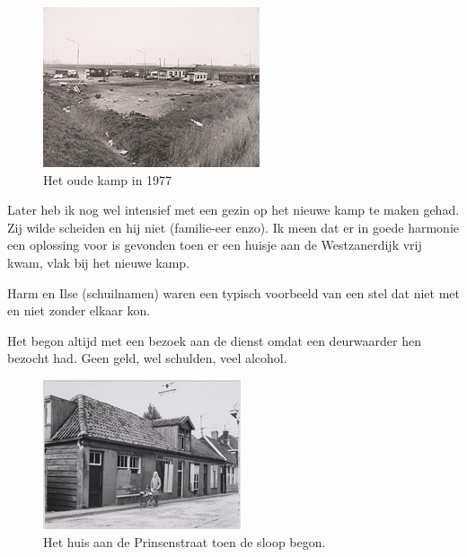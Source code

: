 \documentclass[10pt,twoside, openright]{memoir}
\begin{document}
\begin{figure}
\includegraphics[width=\textwidth]{img/ch42/woonwagenkamp1977}
\caption*{\footnotesize Het oude kamp in 1977}
\end{figure}

Later heb ik nog wel intensief met een gezin op het nieuwe kamp te maken gehad. Zij wilde scheiden en hij niet (familie-eer enzo). Ik meen dat er in goede harmonie een oplossing voor is gevonden toen er een huisje aan de Westzanerdijk vrij kwam, vlak bij het nieuwe kamp. 

Harm en Ilse (schuilnamen) waren een typisch voorbeeld van een stel dat niet met en niet zonder elkaar kon. 

Het begon altijd met een bezoek aan de dienst omdat een deurwaarder hen bezocht had. Geen geld, wel schulden, veel alcohol.

\begin{figure}
\includegraphics[width=\textwidth]{img/ch42/prinsenstraat}
\caption*{\footnotesize Het huis aan de Prinsenstraat toen de sloop begon.}
\end{figure}
\end{document}

